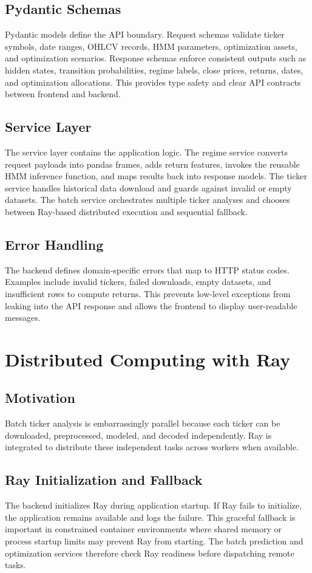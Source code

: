 \documentclass[conference]{IEEEtran}
\begin{document}
\subsection{Pydantic Schemas}
Pydantic models define the API boundary. Request schemas validate ticker symbols, date ranges, OHLCV records, HMM parameters, optimization assets, and optimization scenarios. Response schemas enforce consistent outputs such as hidden states, transition probabilities, regime labels, close prices, returns, dates, and optimization allocations. This provides type safety and clear API contracts between frontend and backend.

\subsection{Service Layer}
The service layer contains the application logic. The regime service converts request payloads into pandas frames, adds return features, invokes the reusable HMM inference function, and maps results back into response models. The ticker service handles historical data download and guards against invalid or empty datasets. The batch service orchestrates multiple ticker analyses and chooses between Ray-based distributed execution and sequential fallback.

\subsection{Error Handling}
The backend defines domain-specific errors that map to HTTP status codes. Examples include invalid tickers, failed downloads, empty datasets, and insufficient rows to compute returns. This prevents low-level exceptions from leaking into the API response and allows the frontend to display user-readable messages.

\section{Distributed Computing with Ray}
\subsection{Motivation}
Batch ticker analysis is embarrassingly parallel because each ticker can be downloaded, preprocessed, modeled, and decoded independently. Ray is integrated to distribute these independent tasks across workers when available.

\subsection{Ray Initialization and Fallback}
The backend initializes Ray during application startup. If Ray fails to initialize, the application remains available and logs the failure. This graceful fallback is important in constrained container environments where shared memory or process startup limits may prevent Ray from starting. The batch prediction and optimization services therefore check Ray readiness before dispatching remote tasks.
\end{document}
